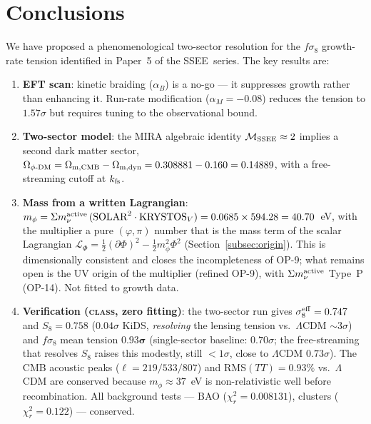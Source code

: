 \documentclass[12pt,a4paper]{article}
\newcommand{\SSEE}{\textsc{SSEE}}
\newcommand{\phiDM}{\phi\text{-DM}}
\newcommand{\MIRA}{\mathcal{M}_{\rm SSEE}}
\newcommand{\kfs}{k_{\rm fs}}
\newcommand{\mphi}{m_\phi}
\newcommand{\mnu}{\Sigma m_\nu}
\newcommand{\sigeff}{\sigma_8^{\rm eff}}
\begin{document}
\section{Conclusions}
\label{sec:conclusions}

We have proposed a phenomenological two-sector resolution for the $f\sigma_8$ growth-rate tension identified in Paper~5 of the
\SSEE\ series. The key results are:

\begin{enumerate}
  \item \textbf{EFT scan}: kinetic braiding ($\alpha_B$) is a no-go — it suppresses
    growth rather than enhancing it. Run-rate modification ($\alpha_M = -0.08$)
    reduces the tension to $1.57\sigma$ but requires tuning to the observational
    bound.

  \item \textbf{Two-sector model}: the MIRA algebraic identity
    $\MIRA \approx 2$ implies a second dark matter sector,
    $\Omega_{\phiDM} = \Omega_{\rm m,CMB}-\Omega_{\rm m,dyn} = 0.308881 - 0.160 = 0.14889$, with a
    free-streaming cutoff at $\kfs$.

  \item \textbf{Mass from a written Lagrangian}:
    $\mphi = \mnu^{\rm active}\,(\mathrm{SOLAR}^2\cdot\mathrm{KRYSTOS}_V)
    = 0.0685 \times 594.28 = 40.70$~eV, with the multiplier a pure
    $(\varphi,\pi)$ number that is the mass term of the scalar Lagrangian
    $\mathcal{L}_\Phi = \tfrac12(\partial\Phi)^2 - \tfrac12 m_\phi^2 \Phi^2$
    (Section~\ref{subsec:origin}). This is dimensionally consistent and closes
    the incompleteness of OP-9; what remains open is the UV origin of the
    multiplier (refined OP-9), with $\Sigma m_\nu^{\rm active}$ Type~P (OP-14).
    Not fitted to growth data.

  \item \textbf{Verification (\textsc{class}, zero fitting)}: the two-sector run
    gives $\sigeff = 0.747$ and $S_8 = 0.758$ ($0.04\sigma$ KiDS,
    \emph{resolving} the lensing tension vs.\ $\Lambda$CDM $\sim3\sigma$) and
    $f\sigma_8$ mean tension $\mathbf{0.93\sigma}$
    (single-sector baseline: $0.70\sigma$; the free-streaming that resolves $S_8$
    raises this modestly, still $<1\sigma$, close to $\Lambda$CDM
    $0.73\sigma$). The CMB acoustic peaks ($\ell = 219/533/807$) and RMS$(TT)
    = 0.93\%$ vs.\ $\Lambda$CDM are conserved because $m_\phi \approx 37$~eV is
    non-relativistic well before recombination. All background tests — BAO
    ($\chi^2_r = 0.008131$), clusters ($\chi^2_r = 0.122$) — conserved.
\end{enumerate}
\end{document}
